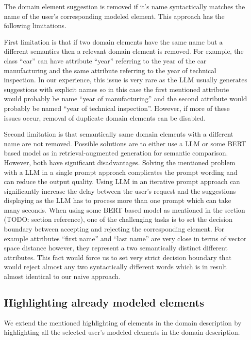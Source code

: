 The domain element suggestion is removed if it's name syntactically matches the name of the user's corresponding modeled element. This approach has the following limitations.

First limitation is that if two domain elements have the same name but a different semantics then a relevant domain element is removed. For example, the class ``car'' can have attribute ``year'' referring to the year of the car manufacturing and the same attribute referring to the year of technical inspection. In our experience, this issue is very rare as the LLM usually generates suggestions with explicit names so in this case the first mentioned attribute would probably be name ``year of manufacturing'' and the second attribute would probably be named ``year of technical inspection''. However, if more of these issues occur, removal of duplicate domain elements can be disabled.

Second limitation is that semantically same domain elements with a different name are not removed. Possible solutions are to either use a LLM or some BERT based model as in retrieval-augmented generation for semantic comparison. However, both have significant disadvantages. Solving the mentioned problem with a LLM in a single prompt approach complicates the prompt wording and can reduce the output quality. Using LLM in an iterative prompt approach can significantly increase the delay between the user's request and the suggestions displaying as the LLM has to process more than one prompt which can take many seconds. When using some BERT based model as mentioned in the section (TODO: section reference), one of the challenging tasks is to set the decision boundary between accepting and rejecting the corresponding element. For example attributes ``first name'' and ``last name'' are very close in terms of vector space distance however, they represent a two semantically distinct different attributes. This fact would force us to set very strict decision boundary that would reject almost any two syntactically different words which is in result almost identical to our naive approach.


\subsection{Highlighting already modeled elements}

We extend the mentioned highlighting of elements in the domain description by highlighting all the selected user's modeled elements in the domain description. \\

